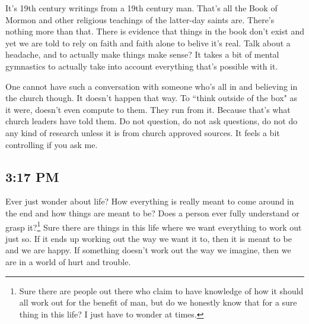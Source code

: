 It's 19th century writings from a 19th century man. That's all the Book of Mormon and
other religious teachings of the latter-day saints are. There's nothing more than
that. There is evidence that things in the book don't exist and yet we are told to
rely on faith and faith alone to belive it's real. Talk about a headache, and to
actually make things make sense? It takes a bit of mental gymnastics to actually take
into account everything that's possible with it.

One cannot have such a conversation with someone who's all in and believing in the
church though. It doesn't happen that way. To ``think outside of the box" as it were,
doesn't even compute to them. They run from it. Because that's what church leaders
have told them. Do not question, do not ask questions, do not do any kind of research
unless it is from church approved sources. It feels a bit controlling if you ask me.

\subsection{3:17 PM}

Ever just wonder about life? How everything is really meant to come around in the end
and how things are meant to be? Does a person ever fully understand or grasp
it?\footnote{Sure there are people out there who claim to have knowledge of how it 
should all work out for the benefit of man, but do we honestly know that for a sure
thing in this life? I just have to wonder at times.} Sure there are things in this
life where we want everything to work out just so. If it ends up working out the way
we want it to, then it is meant to be and we are happy. If something doesn't work out
the way we imagine, then we are in a world of hurt and trouble.